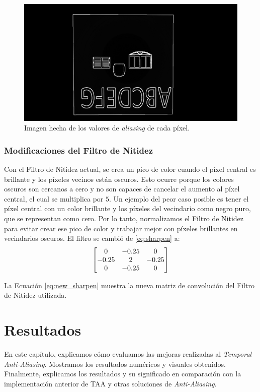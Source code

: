 \documentclass[pregrado]{tesis-usb} %
\begin{document}
\begin{figure}[H]
	\centering
	\includegraphics[scale=0.2]{images/aliased_value_example_3_temporal.png}
	\caption{Imagen hecha de los valores de \textit{aliasing} de cada píxel.}\label{fig:aliasedval3}
\end{figure}

\subsection{Modificaciones del Filtro de Nitidez}
Con el Filtro de Nitidez actual, se crea un pico de color cuando el píxel central es brillante y los píxeles vecinos están oscuros. Esto ocurre porque los colores oscuros son cercanos a cero y no son capaces de cancelar el aumento al píxel central, el cual se multiplica por $5$. Un ejemplo del peor caso posible es tener el píxel central con un color brillante y los píxeles del vecindario como negro puro, que se representan como cero. Por lo tanto, normalizamos el Filtro de Nitidez para evitar crear ese pico de color y trabajar mejor con píxeles brillantes en vecindarios oscuros. El filtro se cambió de \ref{eq:sharpen} a:
\begin{equation} \label{eq:new_sharpen}
\centering
\begin{bmatrix*}[c]
0 & -0.25 &  0 \\
-0.25  &  2 & -0.25  \\
0 & -0.25  &  0
\end{bmatrix*}
\end{equation}

La Ecuación \ref{eq:new_sharpen} muestra la nueva matriz de convolución del Filtro de Nitidez utilizada.


\chapter{Resultados}
En este capítulo, explicamos cómo evaluamos las mejoras realizadas al \textit{Temporal Anti-Aliasing}. Mostramos los resultados numéricos y visuales obtenidos. Finalmente, explicamos los resultados y su significado en comparación con la implementación anterior de TAA y otras soluciones de \textit{Anti-Aliasing}.
\end{document}
